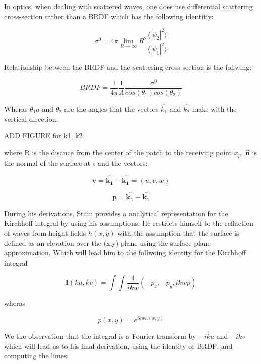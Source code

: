 In optics, when dealing with scattered waves, one does use differential scattering cross-section rather than a BRDF which has the following identitiy: 

\begin{equation}
    \sigma^0 = 4 \pi \lim_{R \to \infty} R^2 \frac{\langle \left|\psi_2\right|^2\rangle}{\langle \left|\psi_1\right|^2\rangle}
\end{equation}

Relationship between the BRDF and the scattering cross section is the follwing:

\begin{equation}
    BRDF = \frac{1}{4\pi}\frac{1}{A}\frac{\sigma^0}{cos(\theta_1)cos(\theta_2)}
\end{equation}

Wheras $\theta_1a$ and $\theta_2$ are the angles that the vectors $\hat{k_1}$
and $\hat{k_2}$ make with the vertical direction.
 
ADD FIGURE for k1, k2

where R is the disance from the center of the patch to the receiving point $x_p$, $\hat{\mathbf{n}}$ is the normal of the surface at s and the vectors:

\begin{equation*}
    \mathbf{v} = \hat{\mathbf{k_1}} - \hat{\mathbf{k_1}}
               = (u,v,w)
\end{equation*}

\begin{equation*}
    \mathbf{p} = \hat{\mathbf{k_1}} + \hat{\mathbf{k_1}}
\end{equation*}

During his derivations, Stam provides a analytical representation for the Kirchhoff integral by using his assumptions. He restricts himself to the reflaction of waves from height fields $h(x,y)$ with the assumption that the surface is defined as an elevation over the (x,y) plane using the surface plane approximation.
Which will lead him to the follwoing identity for the Kirchhoff integral

\begin{equation}
    \mathbf{I}(ku, kv) = \int \int \frac{1}{ikw}(-p_x, -p_y, ikwp) 
\end{equation}

wheras 

\begin{equation}
    p(x,y) = e^{ikwh(x,y)}
\end{equation}

We the observation that the integral is a Fourier transform by $-iku$ and $-ikv$
which will lead us to his final derivation, using the identity of BRDF, and computing the limes:

